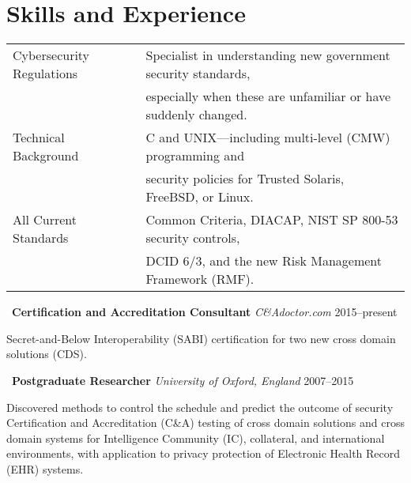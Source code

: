 \section*{Skills and Experience}

\vspace{-2mm}
\begin{tabular*}{\textwidth}{ll}
    \hline
    \rule{0pt}{5mm}Cybersecurity Regulations & Specialist in understanding
        new government security standards, \\
        & especially when these are unfamiliar or have suddenly changed.
            \vspace{1.5mm} \\

    Technical Background & C and UNIX---including multi-level (CMW) programming and \\
        & security policies for Trusted Solaris, FreeBSD, or Linux. \vspace{1.5mm} \\

    \rule[-2mm]{0pt}{1em}All Current Standards & Common Criteria,
        DIACAP, NIST SP 800-53 security controls, \\
        & \rule[-3mm]{0pt}{0pt}DCID 6/3, and the new Risk Management Framework (RMF). \\

    \hline
\end{tabular*}

\vspace{2mm}
\noindent\textbullet\ \textbf{Certification and Accreditation Consultant}
    \hfill \emph{C\&Adoctor.com} \hfill 2015--present

    \vspace{1mm}
    \noindent Secret-and-Below Interoperability (SABI) certification
    for two new cross domain solutions (CDS).

\vspace{1.5mm}
\noindent\textbullet\ \textbf{Postgraduate Researcher}
    \hfill \emph{University of Oxford, England} \hfill 2007--2015

    \vspace{1mm}
    \noindent Discovered methods to control the schedule and predict the
    outcome of security Certification and Accreditation (C\&A)
    testing of cross domain solutions and cross domain systems for
    Intelligence Community (IC), collateral, and international
    environments, with application to privacy protection
    of Electronic Health Record (EHR) systems.

